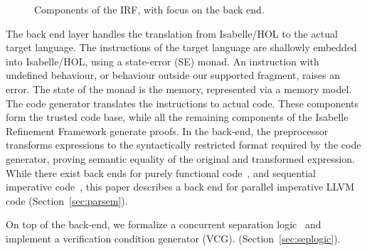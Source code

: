 \documentclass[sn-mathphys,Numbered]{sn-jnl}
\theoremstyle{thmstyleone}%
\theoremstyle{definition}%
\theoremstyle{thmstylethree}%
\begin{document}
\begin{figure}

  \caption{Components of the IRF, with focus on the back end.}\label{fig:IRF-overview}
\end{figure}
%
The back end layer handles the translation from Isabelle/HOL to the actual target language.
The instructions of the target language are shallowly embedded into Isabelle/HOL, using
a state-error (SE) monad. An instruction with undefined behaviour,
or behaviour outside our supported fragment, raises an error.
The state of the monad is the memory, represented via a memory model.
The code generator translates the instructions to actual code.
These components form the trusted code base, while all the remaining components of the
Isabelle Refinement Framework generate proofs. In the back-end, the preprocessor transforms
expressions to the syntactically restricted format required by the code generator,
proving semantic equality of the original and transformed expression.
While there exist back ends for purely functional code~\cite{LaTu12,La13},
and sequential imperative code~\cite{La15,La19-llvm}, this paper describes a back end
for parallel imperative LLVM code (Section~\ref{sec:parsem}).

On top of the back-end, we formalize a concurrent separation logic~\cite{OH04} and implement a verification condition generator (VCG). (Section~\ref{sec:seplogic}).
\end{document}
